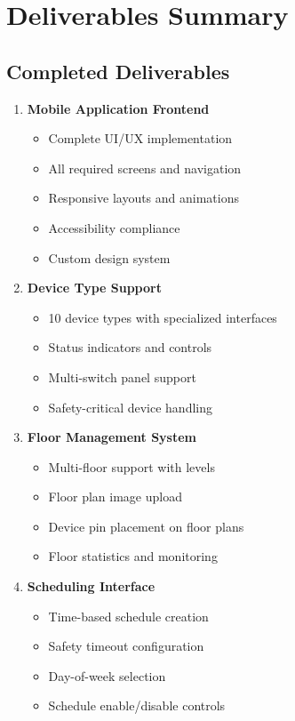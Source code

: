 \documentclass[12pt,a4paper]{article}
\begin{document}
\newpage
\section{Deliverables Summary}

\subsection{Completed Deliverables}

\begin{enumerate}[leftmargin=*]
    \item \textcolor{implemented}{\textbf{Mobile Application Frontend}}
    \begin{itemize}
        \item Complete UI/UX implementation
        \item All required screens and navigation
        \item Responsive layouts and animations
        \item Accessibility compliance
        \item Custom design system
    \end{itemize}
    
    \item \textcolor{implemented}{\textbf{Device Type Support}}
    \begin{itemize}
        \item 10 device types with specialized interfaces
        \item Status indicators and controls
        \item Multi-switch panel support
        \item Safety-critical device handling
    \end{itemize}
    
    \item \textcolor{implemented}{\textbf{Floor Management System}}
    \begin{itemize}
        \item Multi-floor support with levels
        \item Floor plan image upload
        \item Device pin placement on floor plans
        \item Floor statistics and monitoring
    \end{itemize}
    
    \item \textcolor{implemented}{\textbf{Scheduling Interface}}
    \begin{itemize}
        \item Time-based schedule creation
        \item Safety timeout configuration
        \item Day-of-week selection
        \item Schedule enable/disable controls
    \end{itemize}
    

\end{enumerate}
\end{document}
